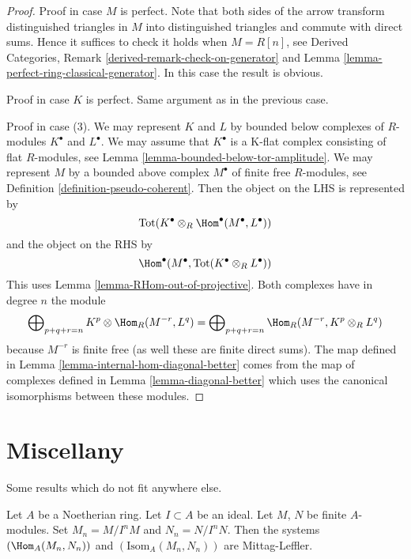 \begin{proof}
Proof in case $M$ is perfect. Note that both sides of the arrow
transform distinguished triangles in $M$ into distinguished triangles
and commute with direct sums. Hence it suffices to check
it holds when $M = R[n]$, see
Derived Categories, Remark \ref{derived-remark-check-on-generator}
and Lemma \ref{lemma-perfect-ring-classical-generator}.
In this case the result is obvious.

\medskip\noindent
Proof in case $K$ is perfect. Same argument as in the previous case.

\medskip\noindent
Proof in case (3). We may represent $K$ and $L$ by
bounded below complexes of $R$-modules $K^\bullet$ and $L^\bullet$.
We may assume that $K^\bullet$ is a K-flat complex
consisting of flat $R$-modules, see
Lemma \ref{lemma-bounded-below-tor-amplitude}.
We may represent $M$ by a bounded above complex $M^\bullet$
of finite free $R$-modules, see Definition \ref{definition-pseudo-coherent}.
Then the object on the LHS is represented by
$$
\text{Tot}(K^\bullet \otimes_R \Hom^\bullet(M^\bullet, L^\bullet))
$$
and the object on the RHS by
$$
\Hom^\bullet(M^\bullet, \text{Tot}(K^\bullet \otimes_R L^\bullet))
$$
This uses Lemma \ref{lemma-RHom-out-of-projective}.
Both complexes have in degree $n$ the module
$$
\bigoplus\nolimits_{p + q + r = n} K^p \otimes \Hom_R(M^{-r}, L^q) =
\bigoplus\nolimits_{p + q + r = n} \Hom_R(M^{-r}, K^p \otimes_R L^q)
$$
because $M^{-r}$ is finite free (as well these are finite direct sums).
The map defined in Lemma \ref{lemma-internal-hom-diagonal-better}
comes from the map of complexes defined in
Lemma \ref{lemma-diagonal-better} which uses
the canonical isomorphisms between these modules.
\end{proof}







\section{Miscellany}
\label{section-misc}

\noindent
Some results which do not fit anywhere else.

\begin{lemma}
\label{lemma-hom-systems-ML}
Let $A$ be a Noetherian ring. Let $I \subset A$ be an ideal. Let $M$, $N$ be
finite $A$-modules. Set $M_n = M/I^nM$ and $N_n = N/I^nN$. Then
the systems $(\Hom_A(M_n, N_n))$ and $(\text{Isom}_A(M_n, N_n))$
are Mittag-Leffler.
\end{lemma}

